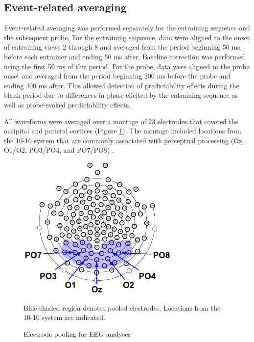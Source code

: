 \documentclass[dwyatte_dissertation.tex]{subfiles}
\begin{document}
\subsection{Event-related averaging}
Event-related averaging was performed separately for the entraining sequence and the subsequent probe. For the entraining sequence, data were aligned to the onset of entraining views 2 through 8 and averaged from the period beginning 50 ms before each entrainer and ending 50 ms after. Baseline correction was performed using the first 50 ms of this period. For the probe, data were aligned to the probe onset and averaged from the period beginning 200 ms before the probe and ending 400 ms after. This allowed detection of predictability effects during the blank period due to differences in phase elicited by the entraining sequence as well as probe-evoked predictability effects.

All waveforms were averaged over a montage of 23 electrodes that covered the occipital and parietal cortices (Figure \ref{fig:pleast_channels}). The montage included locations from the 10-10 system that are commonly associated with perceptual processing (Oz, O1/O2, PO3/PO4, and PO7/PO8) \cite[e.g.,]{DohertyRaoMesulamEtAl05,RohenkohlNobre11,FahrenfortScholteLamme07}.

\begin{figure}[h!]
\begin{center}
\includegraphics[width=80mm]{figs/chap_pleast/channels_all.pdf}
\end{center}
\caption{Electrode pooling for EEG analyses}{Blue shaded region denotes pooled electrodes. Locations from the 10-10 system are indicated.}
\label{fig:pleast_channels}
\end{figure}
\end{document}
